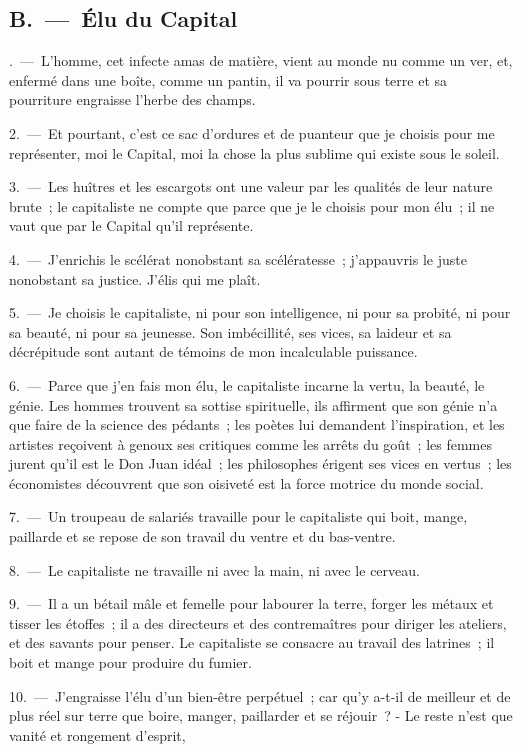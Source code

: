 \documentclass[french,twoside]{book} %
\begin{document}
\subsection[{B. — Élu du Capital}]{B. — Élu du Capital}
. — L'homme, cet infecte amas de matière, vient au monde nu comme un ver, et, enfermé dans une boîte, comme un pantin, il va pourrir sous terre et sa pourriture engraisse l’herbe des champs.\par
2. — Et pourtant, c’est ce sac d’ordures et de puanteur que je choisis pour me représenter, moi le Capital, moi la chose la plus sublime qui existe sous le soleil.\par
3. — Les huîtres et les escargots ont une valeur par les qualités de leur nature brute ; le capitaliste ne compte que parce que je le choisis pour mon élu ; il ne vaut que par le Capital qu’il représente.\par
4. — J'enrichis le scélérat nonobstant sa scélératesse ; j’appauvris le juste nonobstant sa justice. J'élis qui me plaît.\par
5. — Je choisis le capitaliste, ni pour son intelligence, ni pour sa probité, ni pour sa beauté, ni pour sa jeunesse. Son imbécillité, ses vices, sa laideur et sa décrépitude sont autant de témoins de mon incalculable puissance.\par
6. — Parce que j’en fais mon élu, le capitaliste incarne la vertu, la beauté, le génie. Les hommes trouvent sa sottise spirituelle, ils affirment que son génie n’a que faire de la science des pédants ; les poètes lui demandent l’inspiration, et les artistes reçoivent à genoux ses critiques comme les arrêts du goût ; les femmes jurent qu’il est le Don Juan idéal ; les philosophes érigent ses vices en vertus ; les économistes découvrent que son oisiveté est la force motrice du monde social.\par
7. — Un troupeau de salariés travaille pour le capitaliste qui boit, mange, paillarde et se repose de son travail du ventre et du bas-ventre.\par
8. — Le capitaliste ne travaille ni avec la main, ni avec le cerveau.\par
9. — Il a un bétail mâle et femelle pour labourer la terre, forger les métaux et tisser les étoffes ; il a des directeurs et des contremaîtres pour diriger les ateliers, et des savants pour penser. Le capitaliste se consacre au travail des latrines ; il boit et mange pour produire du fumier.\par
10. — J'engraisse l’élu d’un bien-être perpétuel ; car qu’y a-t-il de meilleur et de plus réel sur terre que boire, manger, paillarder et se réjouir ? - Le reste n’est que vanité et rongement d’esprit,\par
\end{document}

